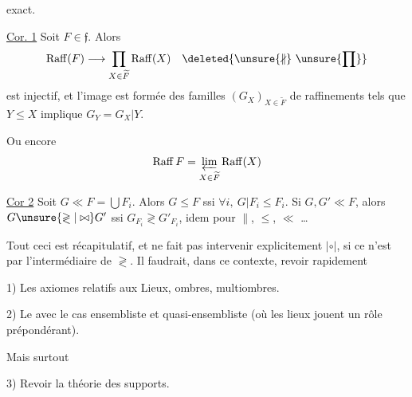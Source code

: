 
exact.

\uline{Cor. 1} Soit $F\in\mathfrak f$. Alors
\[
\operatorname{Raff}(F)\longrightarrow\prod_{X\in\widetilde F}\operatorname{Raff}(X)\quad\deleted{\unsure{\nparallel}\ \unsure{\prod}}
\]
est injectif, et l'image est formée des familles $(G_X)_{X\in\widetilde F}$ de raffinements tels que $Y\leq X$ implique $G_Y=G_X|Y$.

Ou encore
\[
\operatorname{Raff}F=\varprojlim_{X\in\widetilde F}\operatorname{Raff}(X)
\]




\uline{Cor 2} Soit $G\ll F=\bigcup F_i$. Alors $G\leq F$ ssi $\forall i,\ G|F_i\leq F_i$.  Si $G,G'\ll F$, alors $G\unsure{\gtrless|\bowtie}G'$ ssi  $G_{F_i}\gtrless G'_{F_i}$, idem pour $\parallel$, $\leq$, $\ll$ \ldots

Tout ceci est récapitulatif, et ne fait pas intervenir explicitement $\mathrel{|\circ|}$, si ce n'est par l'intermédiaire de $\gtrless$. Il faudrait, dans ce contexte, revoir  rapidement

1) Les axiomes relatifs aux Lieux, ombres, multiombres.

2) Le  avec le cas ensembliste et quasi-ensembliste (où les lieux jouent  un rôle prépondérant).

Mais surtout

3) Revoir la théorie des supports.

